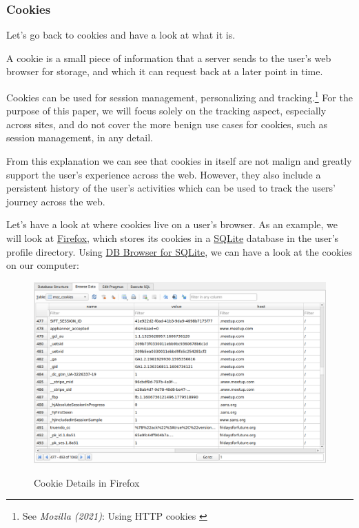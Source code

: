 \subsubsection{Cookies}

Let's go back to cookies and have a look at what it is.

A cookie is a small piece of information that a server sends to the user's web browser for storage, and which it can request back at a later point in time.

Cookies can be used for session management, personalizing and tracking.\footnote{See \textit{Mozilla (2021)}: Using HTTP cookies \cite{usingCookies}} For the purpose of this paper, we will focus solely on the tracking aspect, especially across sites, and do not cover the more benign use cases for cookies, such as session management, in any detail.

From this explanation we can see that cookies in itself are not malign and greatly support the user's experience across the web. However, they also include a persistent history of the user's activities which can be used to track the users' journey across the web.

Let's have a look at where cookies live on a user's browser. As an example, we will look at \href{https://www.mozilla.org/en-US/firefox/new/}{Firefox}, which stores its cookies in a \href{https://www.sqlite.org/index.html}{SQLite} database in the user's profile directory. Using \href{https://sqlitebrowser.org/}{DB Browser for SQLite}, we can have a look at the cookies on our computer:

\begin{figure}[H]
\centering
\caption {Cookie Details in Firefox}
\includegraphics[width=\linewidth]{images/cookie-sqlite.png}
\label{fig:cookies}
\end{figure}

